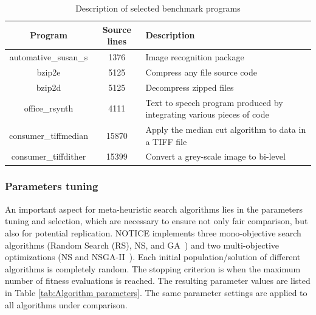 \begin{table}[h]
	\begin{center}
		\begin{tabular}{|c|c|p{5cm}|}
			\hline
			\textbf{Program} & \textbf{Source lines} & \textbf{Description}\\
			\hline
			automative\_susan\_s & 1376 & Image recognition package\\
			\hline
			bzip2e & 5125 & Compress any file
			source code \\
			\hline
			bzip2d & 5125 & Decompress zipped files \\
			\hline
			office\_rsynth & 4111 & Text to speech program produced by integrating various pieces of code\\
			\hline
			consumer\_tiffmedian& 15870 & Apply the median cut algorithm to data in a TIFF file
			\\
			
			\hline
			consumer\_tiffdither& 15399 & Convert a grey-scale image to bi-level
			\\
			\hline	
		\end{tabular}
	\end{center}
	\caption {Description of selected benchmark programs}
	\label{tab:Description of selected benchmark programs}
\end{table}


\subsubsection{Parameters tuning}
An important aspect for meta-heuristic search algorithms lies in the parameters tuning and selection, which are necessary to ensure not only fair comparison, but also for potential replication.
NOTICE implements three mono-objective search algorithms (Random Search (RS), NS, and GA~\cite{cooper2002adaptive}) and two multi-objective optimizations (NS and NSGA-II~\cite{deb2002fast}). Each initial population/solution of different algorithms is completely random. The stopping criterion is when the maximum number of fitness evaluations is reached.
The resulting parameter values are listed in Table \ref{tab:Algorithm parameters}. The same parameter settings are applied to all algorithms under comparison.

